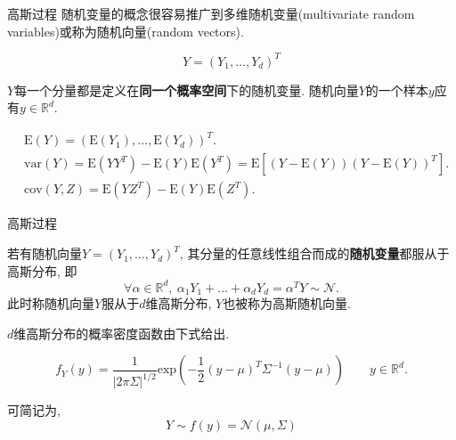 \documentclass[10pt,mathserif]{beamer}
\theoremstyle{definition}
\numberwithin{equation}{section} %
\begin{document}
    \begin{frame}[fragile]{高斯过程}
        随机变量的概念很容易推广到多维随机变量(multivariate random variables)或称为随机向量(random vectors). 

        $$Y=(Y_{1},\dots,Y_{d})^{T}$$

        $Y$每一个分量都是定义在{\bf 同一个概率空间}下的随机变量. 随机向量$Y$的一个样本$y$应有$y\in\mathds{R}^{d}$.
        
        \begin{align}
            &\mathrm{E}(Y)=(\mathrm{E}(Y_{1}),\dots,\mathrm{E}(Y_{d}))^{T}. \\
            &\mathrm{var}(Y)=\mathrm{E}(YY^{T})-\mathrm{E}(Y)\mathrm{E}(Y^{T})=\mathrm{E}[(Y-\mathrm{E}(Y))(Y-\mathrm{E}(Y))^{T}]. \\
            &\mathrm{cov}(Y, Z)=\mathrm{E}(YZ^{T})-\mathrm{E}(Y)\mathrm{E}(Z^{T}).
        \end{align}

    \end{frame}

    \begin{frame}[fragile]{高斯过程}
        \begin{definition}[多维高斯分布] 
            \vspace{2ex}     
            若有随机向量$Y=(Y_{1},\dots,Y_{d})^{T}$, 其分量的任意线性组合而成的{\bf 随机变量}都服从于高斯分布, 即
            \begin{equation}
                \forall\alpha\in\mathds{R}^{d},\ \alpha_{1}Y_{1}+\dots+\alpha_{d}Y_{d}=\alpha^{T}Y\sim\mathcal{N}.
            \end{equation}
            此时称随机向量$Y$服从于$d$维高斯分布, $Y$也被称为高斯随机向量.
        \end{definition}

        $d$维高斯分布的概率密度函数由下式给出.

        \begin{equation}
            f_{Y}(y)=\frac{1}{|2\pi\Sigma|^{1/2}}\mathrm{exp}\left(-\frac{1}{2}(y-\mu)^{T}\Sigma^{-1}(y-\mu)\right) \qquad y\in\mathds{R}^{d}. \label{2.6}
        \end{equation}

        可简记为,
        \begin{equation}
            Y \sim f(y)=\mathcal{N}(\mu, \Sigma)
        \end{equation}

    \end{frame}
\end{document}
